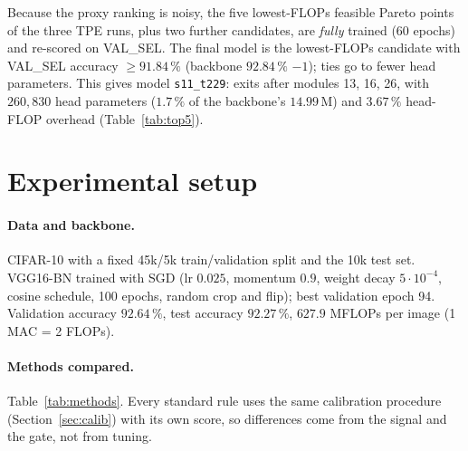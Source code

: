 \documentclass[10pt,a4paper]{article}
\newcommand{\meth}[1]{\texttt{#1}}
\begin{document}
Because the proxy ranking is noisy, the five lowest-FLOPs feasible Pareto points of the three TPE runs, plus
two further candidates, are \emph{fully} trained (60 epochs) and re-scored on VAL\_SEL. The final model is
the lowest-FLOPs candidate with VAL\_SEL accuracy $\ge 91.84\,\%$ (backbone $92.84\,\%$ $-1$); ties go to
fewer head parameters. This gives model \meth{s11\_t229}: exits after modules 13, 16, 26, with $260{,}830$
head parameters ($1.7\,\%$ of the backbone's $14.99$\,M) and $3.67\,\%$ head-FLOP overhead
(Table~\ref{tab:top5}).

\section{Experimental setup}\label{sec:setup}

\paragraph{Data and backbone.} CIFAR-10 with a fixed 45k/5k train/validation split and the 10k test set.
VGG16-BN trained with SGD (lr $0.025$, momentum $0.9$, weight decay $5\cdot10^{-4}$, cosine schedule,
100 epochs, random crop and flip); best validation epoch 94. Validation accuracy $92.64\,\%$,
test accuracy $92.27\,\%$, $627.9$ MFLOPs per image (1 MAC = 2 FLOPs).

\paragraph{Methods compared.} Table~\ref{tab:methods}. Every standard rule uses the same calibration
procedure (Section~\ref{sec:calib}) with its own score, so differences come from the signal and the gate,
not from tuning.
\end{document}

